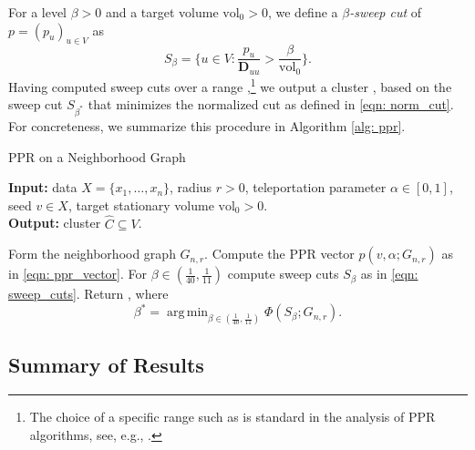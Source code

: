 \documentclass{article}
\newcommand{\vol}{\mathrm{vol}}
\newcommand{\1}{\mathbf{1}}
\newcommand{\pbf}{p}        %
\newcommand{\Xbf}{X}             %
\newcommand{\Dbf}{\mathbf{D}}
\newcommand{\Cest}{\widehat{C}}
\DeclareMathOperator*{\argmin}{arg\,min}
\theoremstyle{aldenthm}
\theoremstyle{aldenrmrk}
\begin{document}
For a level $\beta > 0$ and a target volume $\vol_0 > 0$, we define a
\emph{$\beta$-sweep cut} of $\pbf = (p_u)_{u \in V}$ as  
\begin{equation}
\label{eqn: sweep_cuts}
S_\beta = \{u \in V: \frac{p_u}{\Dbf_{uu}} > \frac{\beta}{\vol_{0}}\}.
\end{equation}
Having computed sweep cuts over a range ,\footnote{The choice of a specific range such as 
 is standard in the analysis of PPR
algorithms, see, e.g., \citep{zhu2013}.}
we output a cluster \smash{$\Cest = S_{\beta^*}$}, based on the sweep cut
$S_{\beta^*}$ that minimizes the normalized cut  as defined in \eqref{eqn: norm_cut}. For concreteness, we summarize
this procedure in Algorithm \ref{alg: ppr}.   

\begin{algorithm}
\caption{PPR on a Neighborhood Graph}
\label{alg: ppr}	
{\bfseries Input:} data $\Xbf=\{x_1,\ldots,x_n\}$, radius $r > 0$, teleportation 
parameter $\alpha \in [0,1]$, seed $v \in \Xbf$, target stationary volume $\vol_0 >
0$. \\   
{\bfseries Output:} cluster $\Cest \subseteq V$.
\begin{algorithmic}[1]
  \STATE Form the neighborhood graph $G_{n,r}$.
  \STATE Compute the PPR vector $\pbf(v, \alpha; G_{n,r})$ as in \eqref{eqn:
    ppr_vector}. 
  \STATE For $\beta \in (\frac{1}{40}, \frac{1}{11})$ compute sweep cuts
  $S_{\beta}$ as in \eqref{eqn: sweep_cuts}.
  \STATE Return \smash{$\Cest = S_{\beta^*}$}, where 
  $$
  \beta^* = \argmin_{\beta \in (\frac{1}{40}, \frac{1}{11})} \Phi(S_{\beta}; G_{n,r}).
  $$
\end{algorithmic}
\end{algorithm}

\subsection{Summary of Results}

\end{document}
